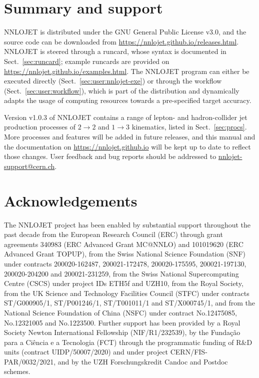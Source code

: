 \documentclass{SciPost}
\newcommand{\nnlojetversion}{1.0.3}
\DeclareRobustCommand{\command}[1]{\makebox{\lstinline[language=commands]^#1^}}
\newcommand{\myurl}[1]{\href{#1}{#1}}
\begin{document}
\section{Summary and support}
\label{sec:concl}

NNLOJET is distributed under the GNU General Public License v3.0, and the source code can be downloaded from \myurl{https://nnlojet.github.io/releases.html}.
NNLOJET is steered through a runcard, whose syntax is documented in Sect.~\ref{sec:runcard}; example runcards are provided on \myurl{https://nnlojet.github.io/examples.html}.
The NNLOJET program can either be executed directly (Sect.~\ref{sec:user:nnlojet-exe}) or through the \command{nnlojet-run} workflow (Sect.~\ref{sec:user:workflow}), which is part of the distribution and dynamically adapts the usage of computing resources towards a pre-specified target accuracy.

Version v\nnlojetversion{} of NNLOJET contains a range of lepton- and hadron-collider jet production processes of $2\to 2$ and $1\to 3$ kinematics, listed in Sect.~\ref{sec:procs}.
More processes and features will be added in future releases, and this manual and the documentation on \myurl{https://nnlojet.github.io} will be kept up to date to reflect those changes.
User feedback and bug reports should be addressed to \href{mailto:nnlojet-support@cern.ch}{nnlojet-support@cern.ch}.


\section*{Acknowledgements}

The NNLOJET project has been enabled by substantial support throughout the past decade
from the European Research Council (ERC) through grant agreements
340983 (ERC Advanced Grant MC@NNLO)
and
101019620 (ERC Advanced Grant TOPUP), from the Swiss National Science Foundation (SNF)
under contracts  200020-162487, 200021-172478,  200020-175595, 200021-197130, 200020-204200 and
200021-231259, from the Swiss National Supercomputing Centre (CSCS) under project IDs ETH5f and UZH10,
from the Royal Society, from the UK Science and Technology Facilities Council (STFC) under contracts ST/G000905/1,  ST/P001246/1,  ST/T001011/1  and ST/X000745/1, and from the National Science Foundation of China (NSFC) under contract No.12475085, No.12321005 and No.1223500.
Further support has been provided by a Royal Society Newton International Fellowship (NIF/R1/232539), by the Fundação para a Ciência e a Tecnologia (FCT) through the programmatic funding of R\&D units (contract UIDP/50007/2020) and under project CERN/FIS-PAR/0032/2021, and by the UZH Forschungskredit Candoc and Postdoc schemes.
\end{document}
